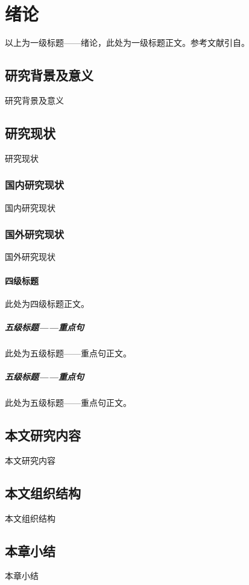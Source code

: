 
\chapter{绪论}%
以上为一级标题——绪论，此处为一级标题正文。参考文献引自\cite{tlc}。
\section{研究背景及意义}
研究背景及意义
\section{研究现状}
研究现状
\subsection{国内研究现状}
国内研究现状
\subsection{国外研究现状}
国外研究现状
\subsubsection{四级标题}
此处为四级标题正文。
\paragraph{五级标题——重点句}
此处为五级标题——重点句正文。
\paragraph{五级标题——重点句}
此处为五级标题——重点句正文。
\section{本文研究内容}
本文研究内容
\section{本文组织结构}
本文组织结构
\section{本章小结}
本章小结




